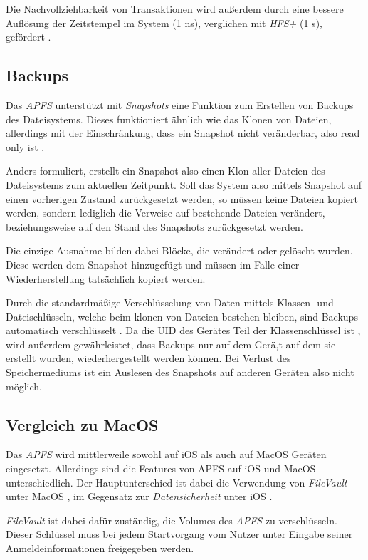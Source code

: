 Die Nachvollziehbarkeit von Transaktionen wird außerdem durch eine bessere
Auflösung der Zeitstempel im System (1 ns), verglichen mit \textit{HFS+} (1 s),
gefördert \cite{arstechnica}.


\subsection{Backups}
Das \textit{APFS} unterstützt mit \textit{Snapshots} eine Funktion zum Erstellen
von Backups des Dateisystems. Dieses funktioniert ähnlich wie das Klonen von
Dateien, allerdings mit der Einschränkung, dass ein Snapshot nicht veränderbar,
also read only ist \cite{arstechnica}.

Anders formuliert, erstellt ein Snapshot also einen Klon aller Dateien des
Dateisystems zum aktuellen Zeitpunkt. Soll das System also mittels Snapshot auf
einen vorherigen Zustand zurückgesetzt werden, so müssen keine Dateien kopiert
werden, sondern lediglich die Verweise auf bestehende Dateien verändert,
beziehungsweise auf den Stand des Snapshots zurückgesetzt werden.

Die einzige Ausnahme bilden dabei Blöcke, die verändert
oder gelöscht wurden. Diese werden dem Snapshot hinzugefügt und müssen im Falle
einer Wiederherstellung tatsächlich kopiert werden.

Durch die standardmäßige Verschlüsselung von Daten mittels Klassen- und
Dateischlüsseln, welche beim klonen von Dateien bestehen bleiben, sind Backups
automatisch verschlüsselt \cite[S. 50]{apple2020}. Da die UID des Gerätes Teil
der Klassenschlüssel ist \cite[S. 50]{apple2020}, wird außerdem gewährleistet,
dass Backups nur auf dem Gerä,t auf dem sie erstellt wurden, wiederhergestellt
werden können. Bei Verlust des Speichermediums ist ein Auslesen des Snapshots
auf anderen Geräten also nicht möglich.


\subsection{Vergleich zu MacOS}
Das \textit{APFS} wird mittlerweile sowohl auf iOS als auch auf MacOS Geräten
eingesetzt. Allerdings sind die Features von APFS auf iOS und MacOS
unterschiedlich. Der Hauptunterschied ist dabei die Verwendung von
\textit{FileVault} unter MacOS \cite[S. 56 ff]{apple2020}, im Gegensatz zur
\textit{Datensicherheit} unter iOS \cite[S. 48 ff]{apple2020}.

\textit{FileVault} ist dabei dafür zuständig, die Volumes des \textit{APFS} zu
verschlüsseln. Dieser Schlüssel muss bei jedem Startvorgang vom Nutzer unter
Eingabe seiner Anmeldeinformationen freigegeben werden.

